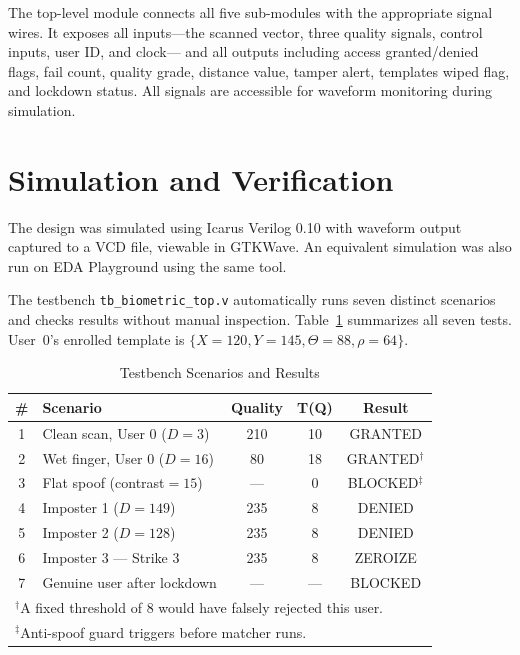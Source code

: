 \documentclass[conference]{IEEEtran}
\begin{document}
The top-level module connects all five sub-modules with the
appropriate signal wires. It exposes all inputs---the scanned
vector, three quality signals, control inputs, user ID, and clock---
and all outputs including access granted/denied flags, fail count,
quality grade, distance value, tamper alert, templates wiped flag,
and lockdown status. All signals are accessible for waveform
monitoring during simulation.

\section{Simulation and Verification}

The design was simulated using Icarus Verilog 0.10 with waveform
output captured to a VCD file, viewable in GTKWave. An equivalent
simulation was also run on EDA Playground using the same tool.

The testbench \texttt{tb\_biometric\_top.v} automatically runs
seven distinct scenarios and checks results without manual inspection.
Table~\ref{tab:sim} summarizes all seven tests. User~0's enrolled
template is $\{X=120, Y=145, \Theta=88, \rho=64\}$.

\begin{table}[htbp]
\caption{Testbench Scenarios and Results}
\begin{center}
\begin{tabular}{|c|p{2.9cm}|c|c|c|}
\hline
\textbf{\#} & \textbf{Scenario} & \textbf{Quality} & \textbf{T(Q)} & \textbf{Result} \\
\hline
1 & Clean scan, User 0 ($D\!=\!3$)          & 210 & 10 & GRANTED \\
\hline
2 & Wet finger, User 0 ($D\!=\!16$)         & 80  & 18 & GRANTED$^{\dagger}$ \\
\hline
3 & Flat spoof (contrast$=\!15$)            & --- & 0  & BLOCKED$^{\ddagger}$ \\
\hline
4 & Imposter 1 ($D\!=\!149$)                & 235 & 8  & DENIED \\
\hline
5 & Imposter 2 ($D\!=\!128$)                & 235 & 8  & DENIED \\
\hline
6 & Imposter 3 --- Strike 3                 & 235 & 8  & ZEROIZE \\
\hline
7 & Genuine user after lockdown             & --- & ---  & BLOCKED \\
\hline
\multicolumn{5}{l}{$^{\dagger}$A fixed threshold of 8 would have falsely rejected this user.}\\
\multicolumn{5}{l}{$^{\ddagger}$Anti-spoof guard triggers before matcher runs.}\\
\end{tabular}
\label{tab:sim}
\end{center}
\end{table}
\end{document}
